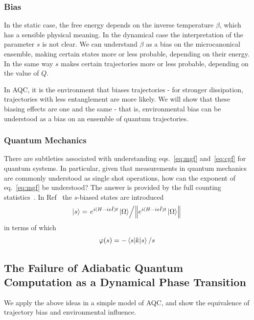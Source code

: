 \documentclass{article}
\begin{document}
\subsubsection{Bias}
%
In the static case, the free energy depends on the inverse temperature $\beta$, which has a sensible physical meaning. 
In the dynamical case the interpretation of the parameter $s$ is not clear. 
We can understand $\beta$ as a bias on the microcanonical ensemble, making certain states more or less probable, depending on their energy.
In the same way $s$ makes certain trajectories more or less probable, depending on the value of $Q$.

In AQC, it is the environment that biases trajectories - for stronger dissipation, trajectories with less entanglement are more likely. 
We will show that these biasing effects are one and the same - that is, environmental bias can be understood as a bias on an ensemble of quantum trajectories. 
%
\subsubsection{Quantum Mechanics}
%
There are subtleties associated with understanding eqs.~\ref{eq:mgf} and~\ref{eq:cgf} for quantum systems. 
In particular, given that measurements in quantum mechanics are commonly understood as single shot operations, how can the exponent of eq.~\ref{eq:mgf} be understood?
The answer is provided by the full counting statistics~\cite{Nazarov2001}.
In Ref~\cite{Hickey2013} the $s$-biased states are introduced
\begin{equation}
    \ket{s} = \flatfrac{e^{i(H-is\hat{I})t} \ket{\Omega}}{\norm{e^{i(H-is\hat{I})t} \ket{\Omega}}}\label{eq:bias}
\end{equation}
in terms of which 
\begin{equation}
    \varphi(s) = -\ev{k}{s}/s\label{eq:dyn}
\end{equation}
\subsection{The Failure of Adiabatic Quantum Computation as a Dynamical Phase Transition}
We apply the above ideas in a simple model of AQC, and show the equivalence of trajectory bias and environmental influence.
%
\end{document}

